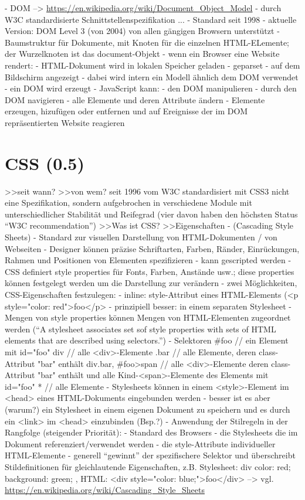 \documentclass[a4paper, 12pt, hidelinks, listof=totoc, listoftables=totoc, bibliography=totoc]{scrreprt}
\begin{document}
- DOM  --> \url{https://en.wikipedia.org/wiki/Document_Object_Model}
	- durch W3C standardisierte Schnittstellenspezifikation ...
	- Standard seit 1998
	- aktuelle Version: DOM Level 3 (von 2004) von allen gängigen Browsern unterstützt
	- Baumstruktur für Dokumente, mit Knoten für die einzelnen HTML-ELemente; der Wurzelknoten ist das document-Objekt
	- wenn ein Browser eine Website rendert:
		- HTML-Dokument wird in lokalen Speicher geladen
		- geparset
		- auf dem Bildschirm angezeigt
		- dabei wird intern ein Modell ähnlich dem DOM verwendet
		- ein DOM wird erzeugt
	- JavaScript kann:
		- den DOM manipulieren
		- durch den DOM navigieren
		- alle Elemente und deren Attribute ändern
		- Elemente erzeugen, hizufügen oder entfernen und auf Ereignisse der im DOM repräsentierten Website reagieren



\section{CSS (0.5)}

>>seit wann?
>>von wem?
  seit 1996 vom W3C standardisiert
  mit CSS3 nicht eine Spezifikation, sondern aufgebrochen in verschiedene Module mit unterschiedlicher Stabilität und Reifegrad (vier davon haben den höchsten Status "`W3C recommendation"')
>>Was ist CSS?
>>Eigenschaften
	- (Cascading Style Sheets)
	- Standard zur visuellen Darstellung von HTML-Dokumenten / von Webseiten
	- Designer können präzise Schriftarten, Farben, Ränder, Einrückungen, Rahmen und Positionen von Elementen spezifizieren
	- kann gescripted werden
	- CSS definiert style properties für Fonts, Farben, Anstände usw.; diese properties können festgelegt werden um die Darstellung zur verändern
	- zwei Möglichkeiten, CSS-Eigenschaften festzulegen:
		- inline: style-Attribut eines HTML-Elements (<p style="color: red">foo</p>
		- prinzipiell besser: in einem separaten Stylesheet
			- Mengen von style properties können Mengen von HTML-Elementen zugeordnet werden ("`A stylesheet associates set sof style properties with sets of HTML elements that are described using selectors."')
			- Selektoren
				\#foo // ein Element mit id="foo"
				div  // alle <div>-Elemente
				.bar // alle Elemente, deren class-Attribut "bar" enthält
				div.bar, \#foo>span // alle <div>-Elemente deren class-Attribut "bar" enthält und alle Kind-<span>-Elemente des Elements mit id="foo"
				* // alle Elemente
			- Stylesheets können in einem <style>-Element im <head> eines HTML-Dokuments eingebunden werden
			- besser ist es aber (warum?) ein Stylesheet in einem eigenen Dokument zu speichern und es durch ein <link> im <head> einzubinden (Bsp.?)
	- Anwendung der Stilregeln in der Rangfolge (steigender Priorität):
		- Standard des Browsers
		- die Stylesheets die im Dokument referenziert/verwendet werden
		- die style-Attribute individueller HTML-Elemente
		- generell "`gewinnt"' der spezifischere Selektor und überschreibt Stildefinitionen für gleichlautende Eigenschaften, z.B. Stylesheet: div { color: red; background: green; }, HTML: <div style="color: blue;">foo</div>
	-->  vgl. \cite[S. 413 ff.]{flanagan2011.JDG}
	\url{https://en.wikipedia.org/wiki/Cascading_Style_Sheets}
\end{document}
